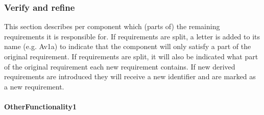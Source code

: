 \documentclass[a4paper,10pt]{article}
\begin{document}
\subsubsection{Verify and refine}
This section describes per component which (parts of) the remaining requirements it is responsible for. If requirements are split, a letter is added to its name (e.g. Av1a) to indicate that the component will only satisfy a part of the original requirement. If requirements are split, it will also be indicated what part of the original requirement each new requirement contains. If new derived requirements are introduced they will receive a new identifier and are marked as a new requirement.

\paragraph{OtherFunctionality1}
\end{document}

